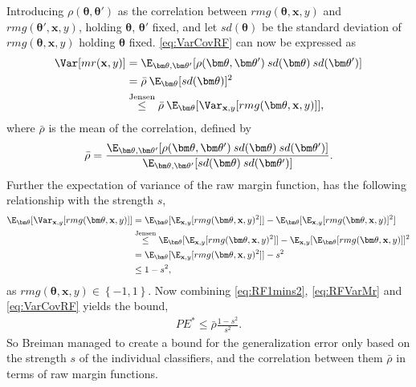 Introducing $\rho(\bm \theta, \bm \theta')$ as the correlation between $rmg(\bm \theta, \mathbf{x}, y)$ and $rmg(\bm \theta', \mathbf{x}, y)$, holding $\bm \theta$, $\bm \theta'$ fixed, and let $sd(\bm \theta)$ be the standard deviation of $rmg(\bm \theta, \mathbf{x}, y)$ holding $\bm \theta$ fixed. \eqref{eq:VarCovRF} can now be expressed as 
\begin{align}
  \Var[mr(\mathbf{x}, y)] 
  &= \E_{\bm \theta, \bm \theta'}[\rho(\bm \theta, \bm \theta') \: sd(\bm \theta) \: sd(\bm \theta')] \notag \\
  &= \bar \rho \: \E_{\bm \theta}[sd(\bm \theta)]^2 \notag \\
  \label{eq:RFVarMr} 
  &\overset{\text{Jensen}}{\leq}  \bar \rho \: \E_{\bm \theta}[\Var_{\mathbf{x}, y}[rmg(\bm \theta, \mathbf{x}, y)]],
\end{align}
where $\bar \rho$ is the mean of the correlation, defined by
\begin{align}
  \bar \rho = 
  \frac{\E_{\bm \theta, \bm \theta'}[\rho(\bm \theta, \bm \theta') \: sd(\bm \theta) \: sd(\bm \theta')]}
  {\E_{\bm \theta, \bm \theta'}[sd(\bm \theta) \: sd(\bm \theta')]}.
\end{align}
Further the expectation of variance of the raw margin function, has the following relationship with the strength $s$,
\begin{align}
  \E_{\bm \theta}[\Var_{\mathbf{x}, y}[rmg(\bm \theta, \mathbf{x}, y)]] 
  &= \E_{\bm \theta}[\E_{\mathbf{x}, y}[rmg(\bm \theta, \mathbf{x}, y)^2]] - \E_{\bm \theta}[\E_{\mathbf{x}, y}[rmg(\bm \theta, \mathbf{x}, y)]^2] \notag \\
  &\overset{\text{Jensen}}{\leq}
  \E_{\bm \theta}[\E_{\mathbf{x}, y}[rmg(\bm \theta, \mathbf{x}, y)^2]] - \E_{\mathbf{x}, y}[\E_{\bm \theta}[rmg(\bm \theta, \mathbf{x}, y)]]^2 \notag \\
  &= \E_{\bm \theta}[\E_{\mathbf{x}, y}[rmg(\bm \theta, \mathbf{x}, y)^2]] - s^2 \notag \\
  \label{eq:RF1mins2} 
  &\leq 1 - s^2,
\end{align}
as $rmg(\bm \theta, \mathbf{x}, y) \in \left\{ -1, 1 \right\}$. Now combining \eqref{eq:RF1mins2}, \eqref{eq:RFVarMr} and \eqref{eq:VarCovRF} yields the bound,
\begin{align}
  PE^* \leq \bar \rho  \frac{1 - s^2}{s^2} .
\end{align}
So Breiman managed to create a bound for the generalization error only based on the strength $s$ of the individual classifiers, and the correlation between them $\bar \rho$ in terms of raw margin functions. 

